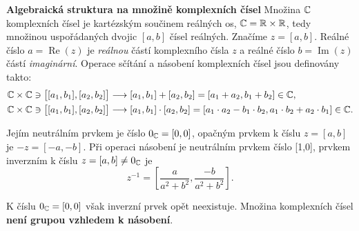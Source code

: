 \wikitextrule
\begin{example}\label{mai:exam048}
  \textbf{Algebraická struktura na množině komplexních čísel}\newline\small
    Množina \(\mathbb{C}\) komplexních čísel je kartézským součinem reálných os, \(\mathbb{C} = 
    \mathbb{R} \times \mathbb{R}\), tedy množinou uspořádaných dvojic \([a, b]\) čísel reálných. 
    Značíme \(z = [a, b]\). Reálné číslo \(a = \operatorname{Re}(z)\) je \emph{reálnou} částí 
    komplexního čísla \(z\) a reálné číslo \(b = \operatorname{Im}(z)\) částí \emph{imaginární}. 
    Operace sčítání a násobení komplexních čísel jsou definovány takto:
    \begin{align*}
      \mathbb{C}\times\mathbb{C}\ni\left[[a_1, b_1],[a_2, b_2]\right] &\longrightarrow
        [a_1, b_1] + [a_2, b_2] = [a_1 + a_2, b_1 + b_2]\in\mathbb{C},                   \\
      \mathbb{C}\times\mathbb{C}\ni\left[[a_1, b_1],[a_2, b_2]\right] &\longrightarrow
        [a_1, b_1] \cdot [a_2, b_2] = 
        [a_1 \cdot a_2 - b_1 \cdot b_2, a_1 \cdot b_2 + a_2 \cdot b_1]\in\mathbb{C}.
    \end{align*}
    
    
    Jejím neutrálním prvkem je číslo \(0_{\mathbb{C}} = [0,0]\), opačným prvkem k číslu \(z = [a, 
    b]\) je \(-z = [-a, - b]\). Při operaci násobení je neutrálním prvkem číslo [1,0], prvkem 
    inverzním k číslu \(z = [a, b] \neq 0_{\mathbb{C}}\) je
    \begin{equation*}
      z^{-1} = \left[\dfrac{a}{a^2 + b^2}, \dfrac{-b}{a^2 + b^2}\right].
    \end{equation*}
    
    K číslu \(0_{\mathbb{C}} = [0,0]\) však inverzní prvek opět neexistuje. Množina komplexních 
    čísel \textbf{není grupou vzhledem k násobení}.
  \normalsize
\end{example}